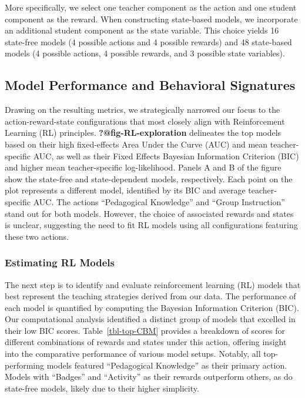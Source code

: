 \documentclass[
  number,
  preprint,
  3p,
  onecolumn]{elsarticle}
\begin{document}
More specifically, we select one teacher component as the action and one
student component as the reward. When constructing state-based models,
we incorporate an additional student component as the state variable.
This choice yields 16 state-free models (4 possible actions and 4
possible rewards) and 48 state-based models (4 possible actions, 4
possible rewards, and 3 possible state variables).

\subsection{Model Performance and Behavioral
Signatures}\label{model-performance-and-behavioral-signatures}

Drawing on the resulting metrics, we strategically narrowed our focus to
the action-reward-state configurations that most closely align with
Reinforcement Learning (RL) principles. \textbf{?@fig-RL-exploration}
delineates the top models based on their high fixed-effects Area Under
the Curve (AUC) and mean teacher-specific AUC, as well as their Fixed
Effects Bayesian Information Criterion (BIC) and higher mean
teacher-specific log-likelihood. Panels A and B of the figure show the
state-free and state-dependent models, respectively. Each point on the
plot represents a different model, identified by its BIC and average
teacher-specific AUC. The actions ``Pedagogical Knowledge'' and ``Group
Instruction'' stand out for both models. However, the choice of
associated rewards and states is unclear, suggesting the need to fit RL
models using all configurations featuring these two actions.

\subsubsection{Estimating RL Models}\label{estimating-rl-models}

The next step is to identify and evaluate reinforcement learning (RL)
models that best represent the teaching strategies derived from our
data. The performance of each model is quantified by computing the
Bayesian Information Criterion (BIC). Our computational analysis
identified a distinct group of models that excelled in their low BIC
scores. Table~\ref{tbl-top-CBM} provides a breakdown of scores for
different combinations of rewards and states under this action, offering
insight into the comparative performance of various model setups.
Notably, all top-performing models featured ``Pedagogical Knowledge'' as
their primary action. Models with ``Badges'' and ``Activity'' as their
rewards outperform others, as do state-free models, likely due to their
higher simplicity.
\end{document}
